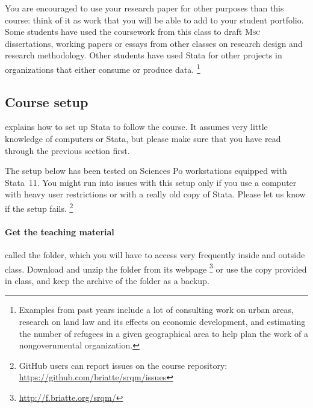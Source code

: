 \begin{enumerate}
		You are encouraged to use your research paper for other purposes than this course: think of it as work that you will be able to add to your student portfolio. Some students have used the coursework from this class to draft \textsc{Msc} dissertations, working papers or essays from other classes on research design and research methodology. Other students have used Stata for other projects in organizations that either consume or produce data.%
      \footnote{Examples from past years include a lot of consulting work on urban areas, research on land law and its effects on economic development, and estimating the number of refugees in a given geographical area to help plan the work of a nongovernmental organization.}%
    
\end{enumerate}

%
\subsection{Course setup}%
	\label{sec:course-setup}%

	 explains how to set up Stata to follow the course. It assumes very little knowledge of computers or Stata, but please make sure that you have read through the previous section first. %

	The setup below has been tested on Sciences Po workstations equipped with Stata~11. You might run into issues with this setup only if you use a computer with heavy user restrictions or with a really old copy of Stata. Please let us know if the setup fails.%
    \footnote{GitHub users can report issues on the course repository: \url{https://github.com/briatte/srqm/issues}}%
	
	\paragraph{Get the teaching material}%
		\label{sec:teaching-pack}%

	 called the \SRQM folder, which you will have to access very frequently inside and outside class. Download and unzip the folder from its webpage%
		\footnote{\url{http://f.briatte.org/srqm/}} %
		or use the copy provided in class, and keep the \ZIP archive of the folder as a backup.%
		
